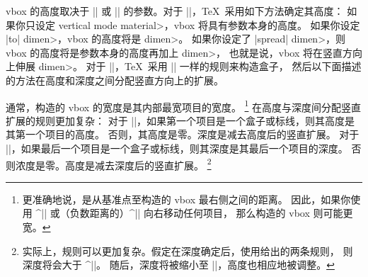 vbox 的高度取决于 |\vtop| 或 |\vbox| 的参数。对于 |\vbox|，\TeX\ 采用如下方法确定其高度：
\ulist\compact
\li 如果你只设定 \<vertical mode material>，vbox 将具有参数本身的高度。
\li 如果你设定 |to| \<dimen>，vbox 的高度将是 \<dimen>。
\li 如果你设定了 |spread| \<dimen>，则 vbox 的高度将是参数本身的高度再加上 \<dimen>，
也就是说，vbox 将在竖直方向上伸展 \<dimen>。
\endulist
\noindent
对于 |\vtop|，\TeX\ 采用 |\vbox| 一样的规则来构造盒子，
然后以下面描述的方法在高度和深度之间分配竖直方向上的扩展。

通常，构造的 vbox 的宽度是其内部最宽项目的宽度。
\footnote{更准确地说，是从基准点至构造的 vbox 最右侧之间的距离。
因此，如果你使用 ^|\moveright| 或（负数距离的）^|\moveleft| 向右移动任何项目，
那么构造的 vbox 则可能更宽。}
在高度与深度间分配竖直扩展的规则更加复杂：
\ulist
\li 对于 |\vtop|，如果第一个项目是一个盒子或标线，则其高度是其第一个项目的高度。
否则，其高度是零。深度是减去高度后的竖直扩展。
\li 对于 |\vbox|，如果最后一个项目是一个盒子或标线，则其深度是其最后一个项目的深度。
否则浓度是零。高度是减去深度后的竖直扩展。
\footnote{实际上，规则可以更加复杂。假定在深度确定后，使用给出的两条规则，
则深度将会大于 ^|\boxmaxdepth|。 随后，深度将被缩小至 |\boxmaxdepth|，高度也相应地被调整。}
\endulist

